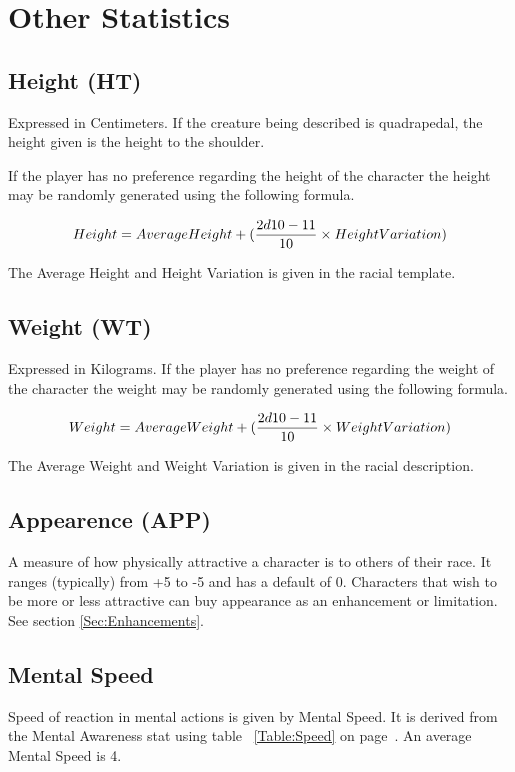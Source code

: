 


\section{Other Statistics}

\subsection{Height (HT)} Expressed in Centimeters. If the creature
being described is quadrapedal, the height given is the height
to the shoulder.

If the player has no preference regarding the height of the character
the height may be randomly generated using the following formula.

\[ Height = {Average Height} + ( {{2d10 - 11} \over {10}} \times
{Height Variation} )
\]

The Average Height and Height Variation is given in the racial
template.

\subsection{Weight (WT)} Expressed in Kilograms. If the player has no 
preference regarding the weight of the character the weight may be 
randomly generated using the following formula. 

\[ Weight = {Average Weight} + ( {{2d10 - 11} \over {10}} \times
{Weight Variation})
\]

The Average Weight and Weight Variation is given in the racial
description.

\subsection{Appearence        (APP)}
A measure of how physically attractive a character is
to others of their race. It ranges (typically) from +5 to -5 and has a
default of 0. Characters that wish to be more or less attractive can buy
appearance as an enhancement or limitation. See section \ref{Sec:Enhancements}.

\subsection{Mental Speed}

Speed of reaction in mental actions is given by 
Mental Speed. It is derived from the
Mental Awareness stat using table ~\ref{Table:Speed} on page~\pageref{Table:Speed}.
An average Mental Speed is 4.


